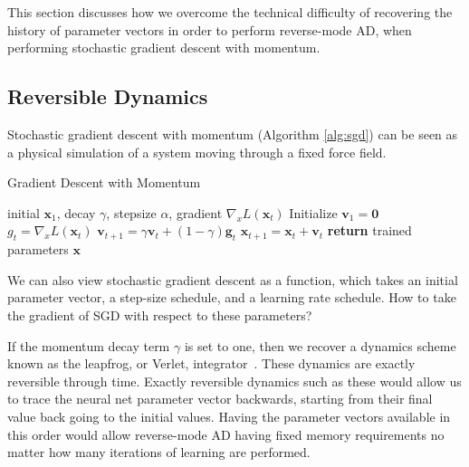 \documentclass{article}
\newcommand{\vx}{\mathbf{x}}
\newcommand{\vv}{\mathbf{v}}
\newcommand{\vg}{\mathbf{g}}
\newcommand{\vzero}{\mathbf{0}}
\newcommand{\decay}{\gamma}
\newcommand{\stepsize}{\alpha}
\newcommand{\gradx}{\nabla_x L(\vx_t)}
\begin{document}
This section discusses how we overcome the technical difficulty of recovering the history of parameter vectors in order to perform reverse-mode AD, when performing stochastic gradient descent with momentum.

\subsection{Reversible Dynamics}

Stochastic gradient descent with momentum (Algorithm \ref{alg:sgd}) can be seen as a physical simulation of a system moving through a fixed force field.
%
\begin{algorithm}
   \caption{Gradient Descent with Momentum}
   \label{alg:sgd}
\begin{algorithmic}[1]
    initial $\vx_1$, decay $\decay$, stepsize $\stepsize$, gradient $\gradx$\!\!
   \State Initialize $\vv_1 = \vzero$
   \State $g_t = \gradx$ 
   \State $\vv_{t+1} = \decay \vv_t + (1 - \decay) \vg_t$ 
   \State $\vx_{t+1} = \vx_t + \vv_t$ 
   \EndFor
   \State \textbf{return} trained parameters $\vx$   
\end{algorithmic}
\end{algorithm}
%
We can also view stochastic gradient descent as a function, which takes an initial parameter vector, a step-size schedule, and a learning rate schedule.
How to take the gradient of SGD with respect to these parameters?

If the momentum decay term $\gamma$ is set to one, then we recover a dynamics scheme known as the leapfrog, or Verlet, integrator~\citep{leapfrog1995}.
These dynamics are exactly reversible through time.
Exactly reversible dynamics such as these would allow us to trace the neural net parameter vector backwards, starting from their final value back going to the initial values.
Having the parameter vectors available in this order would allow reverse-mode AD having fixed memory requirements no matter how many iterations of learning are performed.
\end{document}
